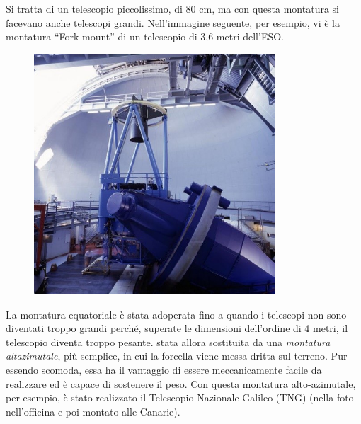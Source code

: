 Si tratta di un telescopio piccolissimo, di 80 cm, ma con questa montatura si facevano anche telescopi grandi. Nell'immagine seguente, per esempio, vi è la montatura “Fork mount” di un telescopio di 3,6 metri dell'ESO.

\begin{figure}[H]
    \centering
    \includegraphics[width=9cm]{10.jpg}
\end{figure}

La montatura equatoriale è stata adoperata fino a quando i telescopi non sono diventati troppo grandi perché, superate le dimensioni dell'ordine di 4 metri, il telescopio diventa troppo pesante. \E stata allora sostituita da una \textit{montatura altazimutale}, più semplice, in cui la forcella viene messa dritta sul terreno. Pur essendo scomoda, essa ha il vantaggio di essere meccanicamente facile da realizzare ed è capace di sostenere il peso. Con questa montatura alto-azimutale, per esempio, è stato realizzato il Telescopio Nazionale Galileo (TNG) (nella foto nell'officina e poi montato alle Canarie).

